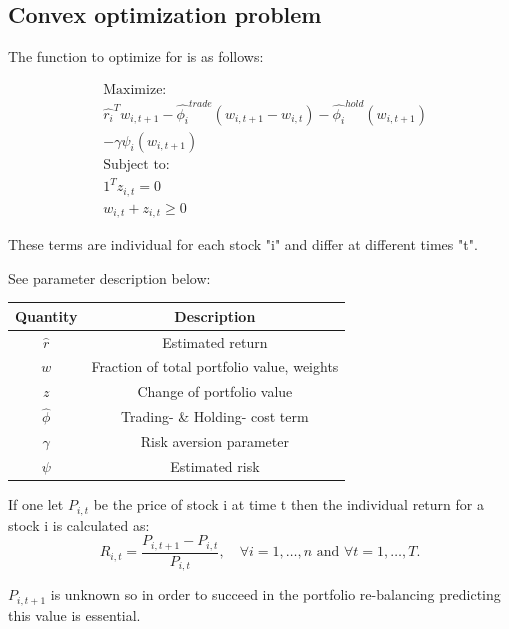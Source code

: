 \documentclass{LTHtwocol} %
\begin{document}
\subsection{Convex optimization problem}
The function to optimize for is as follows:

\begin{equation}
\begin{split}
&\text{Maximize:}\\
&\hat{r_i }^T w_{i,t+1} - \hat{\phi_i}^{trade}(w_{i,t+1}-w_{i,t})-\hat{\phi_i}^{hold}(w_{i,t+1})\\
&-\gamma \psi_i(w_{i,t+1}) \\
&\text{Subject to:} \\
&1^{T}z_{i,t} = 0\\
&w_{i,t}+z_{i,t} \geq 0
\end{split}
\end{equation}


These terms are individual for each stock "i" and differ at different times "t".

See parameter description below:

\begin{center}
 \begin{tabular}{||c c||} 
 \hline
 Quantity & Description \\ [0.5ex] 
 \hline\hline
 $\hat{r}$ & Estimated return \\ 
 \hline
 $w$ & Fraction of total portfolio value, weights \\
 \hline
 $z$ & Change of portfolio value \\
 \hline
 $\hat{\phi}$ & Trading- \& Holding- cost term\\
 \hline
 $\gamma$ & Risk aversion parameter  \\
 \hline
 $\psi$ & Estimated risk  \\ [1ex] 
 \hline
\end{tabular}
\end{center}


If one let ${P_{i,t}}$ be the price of stock i at time t then the individual return for a stock i is calculated as:
$$
R_{i,t} = \frac{P_{i,t+1}-P_{i,t}}{P_{i,t}}, \quad \forall i=1,\ldots,n \text{ and } \forall t = 1,\ldots,T.
$$

$P_{i,t+1}$ is unknown so in order to succeed in the portfolio re-balancing predicting this value is essential.
\end{document}
